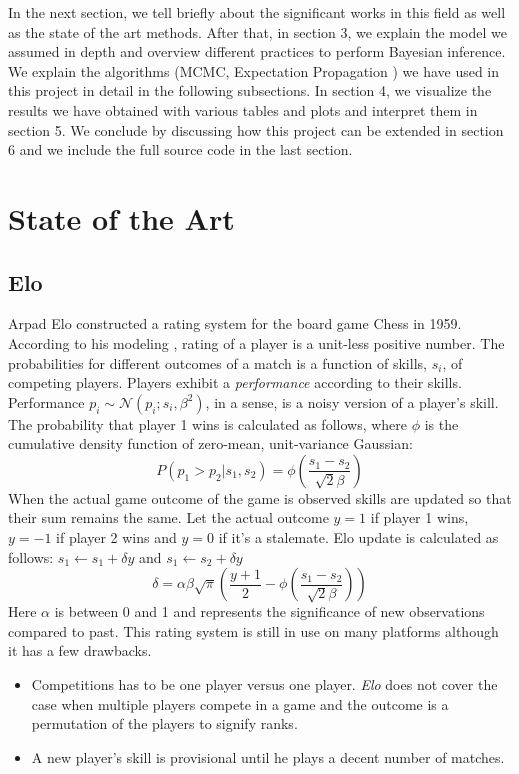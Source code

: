 \documentclass[12pt]{article}
\begin{document}
In the next section, we tell briefly about the significant works in this field as well as the state of the art methods. After that, in section 3, we explain the model we assumed in depth and overview different practices to perform Bayesian inference. We explain the algorithms (MCMC, Expectation Propagation ) we have used in this project in detail in the following subsections. In section 4, we visualize the results we have obtained with various tables and plots and interpret them in section 5. We conclude by discussing how this project can be extended in section 6 and we include the full source code in the last section.



\section{State of the Art}

\subsection{Elo}
Arpad Elo constructed a rating system for the board game Chess in 1959. According to his modeling \cite{elo1978chess}, rating of a player is a unit-less positive number. The probabilities for different outcomes of a match is a function of skills, $s_i$, of competing players. Players exhibit a \textit{performance} according to their skills. Performance $p_i \sim \mathcal{N}(p_i;s_i,\beta^2)$, in a sense, is a noisy version of a player's skill. The probability that player 1 wins is calculated as follows, where $\phi$ is the cumulative density function of zero-mean, unit-variance Gaussian:
$$P(p_1 > p_2 | s_1, s_2) = \phi (\frac{s_1 - s_2}{\sqrt{2} \beta}) $$
When the actual game outcome of the game is observed skills are updated so that their sum remains the same. Let the actual outcome $y = 1$ if player 1 wins, $y=-1$ if player 2 wins and $y=0$ if it's a stalemate. Elo update is calculated as follows: $s_1 \leftarrow s_1 + \delta y$ and $s_1 \leftarrow s_2 + \delta y$
$$\delta = \alpha \beta \sqrt{\pi} \left( \frac{y+1}{2} - \phi \left(\frac{s_1 - s_2}{\sqrt{2} \beta}\right) \right)$$
Here $\alpha$ is between 0 and 1 and represents the significance of new observations compared to past. This rating system is still in use on many platforms although it has a few drawbacks.
\begin{itemize}
	\setlength\itemsep{-1mm}
	\item Competitions has to be one player versus one player. \textit{Elo} does not cover the case when multiple players compete in a game and the outcome is a permutation of the players to signify ranks.
	\item A new player's skill is provisional until he plays a decent number of matches.
\end{itemize}
\end{document}
